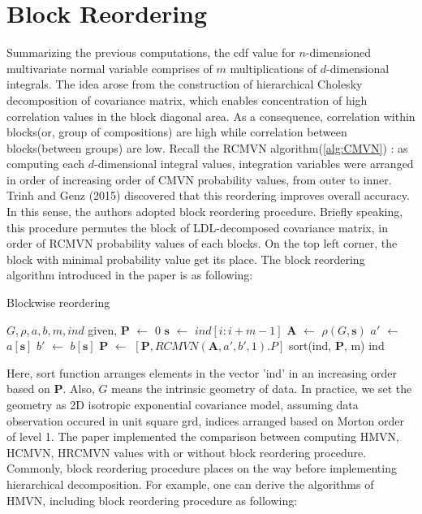 \section{Block Reordering}

Summarizing the previous computations, the cdf value for $n$-dimensioned multivariate normal variable comprises of $m$ multiplications of $d$-dimensional integrals. The idea arose from the construction of hierarchical Cholesky decomposition of covariance matrix, which enables concentration of high correlation values in the block diagonal area. As a consequence, correlation within blocks(or, group of compositions) are high while correlation between blocks(between groups) are low. Recall the RCMVN algorithm(\ref{alg:CMVN}) : as computing each $d$-dimensional integral values, integration variables were arranged in order of increasing order of CMVN probability values, from outer to inner. Trinh and Genz (2015) discovered that this reordering improves overall accuracy. In this sense, the authors adopted block reordering procedure. Briefly speaking, this procedure permutes the block of LDL-decomposed covariance matrix, in order of RCMVN probability values of each blocks. On the top left corner, the block with minimal probability value get its place. The block reordering algorithm introduced in the paper is as following:\\

\begin{algorithm}[h]
    \caption{Blockwise reordering}
	\begin{algorithmic}[1]
            \State $G, \rho, a, b, m, ind$ given, $\mathbf{P}$ $\leftarrow$ $0$
                \State $\mathbf{s}$ $\leftarrow$ $ind[i:i+m-1]$
                \State $\mathbf{A}$ $\leftarrow$ $\rho(G, \mathbf{s})$
                \State $a'$ $\leftarrow$ $a[\mathbf{s}]$
                \State $b'$ $\leftarrow$ $b[\mathbf{s}]$
                \State $\mathbf{P}$ $\leftarrow$ $[\mathbf{P}, RCMVN(\mathbf{A},a',b',1).P]$
            \EndFor
            \State sort(ind, $\mathbf{P}$, m)
            \State \Return ind
        \EndProcedure
    \end{algorithmic}\label{alg:BR}
\end{algorithm}

Here, sort function arranges elements in the vector 'ind' in an increasing order based on $\mathbf{P}$. Also, $G$ means the intrinsic geometry of data. In practice, we set the geometry as 2D isotropic exponential covariance model, assuming data observation occured in unit square grd, indices arranged based on Morton order of level 1. The paper implemented the comparison between computing HMVN, HCMVN, HRCMVN values with or without block reordering procedure. Commonly, block reordering procedure places on the way before implementing hierarchical decomposition. For example, one can derive the algorithms of HMVN, including block reordering procedure as following:\\ 


